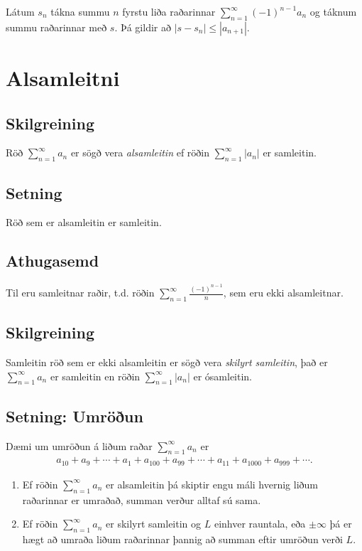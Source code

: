\documentclass[a4paper,10pt,icelandic]{sphinxmanual}
\begin{document}
Látum \(s_n\) tákna summu \(n\) fyrstu liða raðarinnar
\(\sum_{n=1}^\infty (-1)^{n-1}a_n\) og táknum summu raðarinnar með
\(s\). Þá gildir að \(|s-s_n|\leq |a_{n+1}|\).


\section{Alsamleitni}
\label{kafli09:alsamleitni}\label{kafli09:index-10}

\subsection{Skilgreining}
\label{kafli09:id12}
Röð \(\sum_{n=1}^\infty a_n\) er sögð vera \emph{alsamleitin} ef röðin
\(\sum_{n=1}^\infty |a_n|\) er samleitin.


\subsection{Setning}
\label{kafli09:id13}
Röð sem er alsamleitin er samleitin.


\subsection{Athugasemd}
\label{kafli09:id14}
Til eru samleitnar raðir, t.d. röðin
\(\sum_{n=1}^\infty \frac{(-1)^{n-1}}{n}\), sem eru ekki
alsamleitnar.


\subsection{Skilgreining}
\label{kafli09:index-11}\label{kafli09:id15}
Samleitin röð sem er ekki alsamleitin er sögð vera
\emph{skilyrt samleitin}, það er \(\sum_{n=1}^\infty a_n\) er samleitin
en röðin \(\sum_{n=1}^\infty |a_n|\) er ósamleitin.


\subsection{Setning: Umröðun}
\label{kafli09:setning-umroun}
Dæmi um umröðun á liðum raðar \(\sum_{n=1}^\infty a_n\) er
\begin{equation*}
\begin{split}a_{10}+a_9+\cdots+a_1+a_{100}+a_{99}+\cdots+a_{11}+
a_{1000}+a_{999}+\cdots.\end{split}
\end{equation*}\begin{enumerate}
\item {} 
Ef röðin \(\sum_{n=1}^\infty a_n\) er alsamleitin þá skiptir
engu máli hvernig liðum raðarinnar er umraðað, summan verður alltaf
sú sama.

\item {} 
Ef röðin \(\sum_{n=1}^\infty a_n\) er skilyrt samleitin og
\(L\) einhver rauntala, eða \(\pm\infty\) þá er hægt að
umraða liðum raðarinnar þannig að summan eftir umröðun verði
\(L\).

\end{enumerate}
\end{document}
